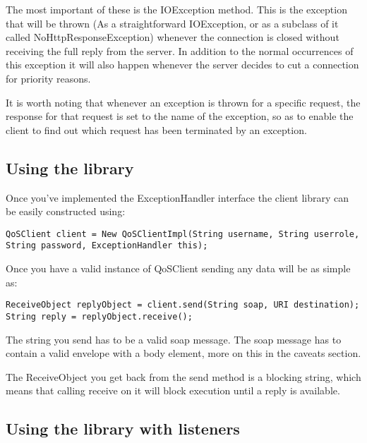     The most important of these is the IOException method. This is the exception that will be thrown (As a straightforward IOException, or as a subclass of it called NoHttpResponseException) whenever the connection is closed without receiving the full reply from the server. In addition to the normal occurrences of this exception it will also happen whenever the server decides to cut a connection for priority reasons.

    It is worth noting that whenever an exception is thrown for a specific request, the response for that request is set to the name of the exception, so as to enable the client to find out which request has been terminated by an exception.

\subsection{Using the library}\label{userguideUsingLibrary}
    
    Once you’ve implemented the ExceptionHandler interface the client library can be easily constructed using:

\begin{lstlisting}[caption={Constructing the library}, label=userguideConstruction]
QoSClient client = New QoSClientImpl(String username, String userrole, String password, ExceptionHandler this);
\end{lstlisting}

Once you have a valid instance of QoSClient sending any data will be as simple as:

\begin{lstlisting}[caption={Sending data}, label=userguideSenddata]
ReceiveObject replyObject = client.send(String soap, URI destination);
String reply = replyObject.receive();
\end{lstlisting}

    The string you send has to be a valid soap message. The soap message has to contain a valid envelope with a body element, more on this in the caveats section.
    
    The ReceiveObject you get back from the send method is a blocking string, which means that calling receive on it will block execution until a reply is available.

\subsection{Using the library with listeners}\label{userguideUsingLibraryWithListeners}
    

